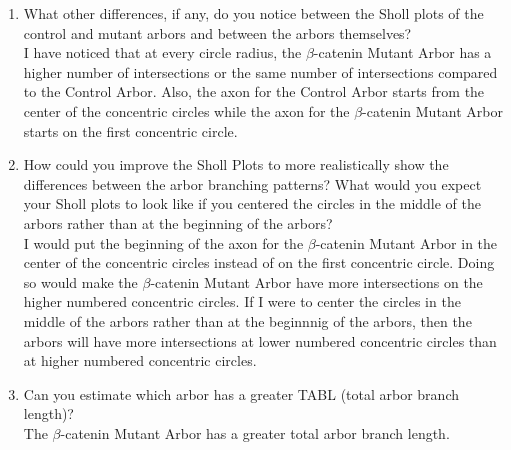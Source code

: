 \documentclass[11pt]{article}
\begin{document}
\begin{enumerate}[label=\arabic*.]
\begin{enumerate}[label=(\alph*)]
\item
What other differences, if any, do you notice between the Sholl plots of the control and mutant arbors and between the arbors themselves?
\vspace*{1\baselineskip}
\\
I have noticed that at every circle radius, the $\beta$-catenin Mutant Arbor has a higher number of intersections or the same number of intersections compared to the Control Arbor. Also, the axon for the Control Arbor starts from the center of the concentric circles while the axon for the $\beta$-catenin Mutant Arbor starts on the first concentric circle.



\item
How could you improve the Sholl Plots to more realistically show the differences between the arbor branching patterns? What would you expect your Sholl plots to look like if you centered the circles in the middle of the arbors rather than at the beginning of the arbors?
\vspace*{1\baselineskip}
\\
I would put the beginning of the axon for the $\beta$-catenin Mutant Arbor in the center of the concentric circles instead of on the first concentric circle. Doing so would make the $\beta$-catenin Mutant Arbor have more intersections on the higher numbered concentric circles. If I were to center the circles in the middle of the arbors rather than at the beginnnig of the arbors, then the arbors will have more intersections at lower numbered concentric circles than at higher numbered concentric circles.



\item
Can you estimate which arbor has a greater TABL (total arbor branch length)?
\vspace*{1\baselineskip}
\\
The $\beta$-catenin Mutant Arbor has a greater total arbor branch length.
\end{enumerate}
\end{enumerate}
\end{document}
